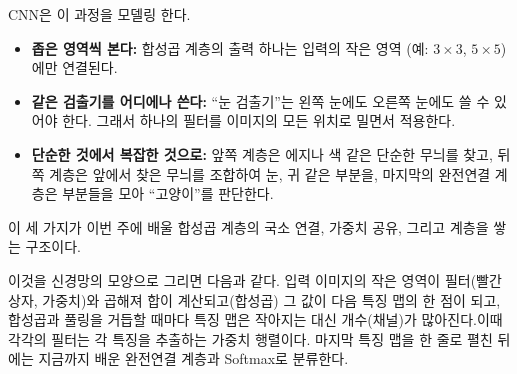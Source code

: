 \documentclass[11pt,a4paper]{article}
\begin{document}
{\begin{center}

\end{center}
}{%
\begin{center}
\end{center}
}

CNN은 이 과정을 모델링 한다.
\begin{itemize}[leftmargin=1.5em]
\item \textbf{좁은 영역씩 본다:} 합성곱 계층의 출력 하나는 입력의 작은 영역 (예: $3\times3$, $5\times5$)에만 연결된다.
\item \textbf{같은 검출기를 어디에나 쓴다:} ``눈 검출기''는 왼쪽 눈에도 오른쪽 눈에도 쓸 수 있어야 한다.
그래서 하나의 필터를 이미지의 모든 위치로 밀면서 적용한다.
\item \textbf{단순한 것에서 복잡한 것으로:} 앞쪽 계층은 에지나 색 같은 단순한 무늬를 찾고,
뒤쪽 계층은 앞에서 찾은 무늬를 조합하여 눈, 귀 같은 부분을, 마지막의 완전연결 계층은 부분들을 모아 ``고양이''를 판단한다.
\end{itemize}
이 세 가지가 이번 주에 배울 합성곱 계층의 국소 연결, 가중치 공유, 그리고 계층을 쌓는 구조이다.

이것을 신경망의 모양으로 그리면 다음과 같다.
입력 이미지의 작은 영역이 필터(빨간 상자, 가중치)와 곱해져 합이 계산되고(합성곱) 그 값이 다음 특징 맵의 한 점이 되고,
합성곱과 풀링을 거듭할 때마다 특징 맵은 작아지는 대신 개수(채널)가 많아진다.이때 각각의 필터는 각 특징을 추출하는 가중치 행렬이다.
마지막 특징 맵을 한 줄로 펼친 뒤에는 지금까지 배운 완전연결 계층과 Softmax로 분류한다.
\end{document}
